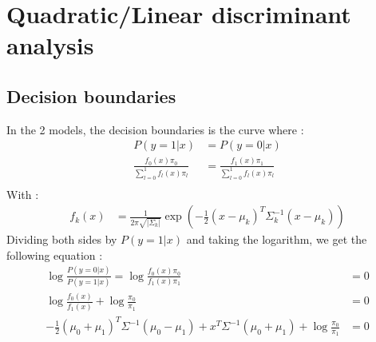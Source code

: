 \documentclass[12pt]{article}
\begin{document}
\section{Quadratic/Linear discriminant analysis}
\subsection{Decision boundaries}
In the 2 models, the decision boundaries is the curve where :
\begin{align}	
P(y=1|x) &= P(y=0|x)\\
\frac{f_0(x)\pi_0}{\sum^1_{l=0}f_l(x)\pi_l}&=\frac{f_1(x)\pi_1}{\sum^1_{l=0}f_l(x)\pi_l}\\
\end{align}
With : 
\begin{align}
	f_k(x) &= \frac{1}{2\pi\sqrt{|\Sigma_k|}}\exp\left(-\frac{1}{2}(x-\mu_k)^T\Sigma_k^{-1}(x-\mu_k)\right)
\end{align}
Dividing both sides by $P(y=1|x)$ and taking the logarithm, we get the following equation :
\begin{align}
	\log\frac{P(y=0|x)}{P(y=1|x)} = \log\frac{f_0(x)\pi_0}{f_1(x)\pi_1 }&=0\\
	\log\frac{f_0(x)}{f_1(x)} + \log\frac{\pi_0}{\pi_1}&= 0\\
	-\frac{1}{2}(\mu_0+\mu_1)^T\Sigma^{-1}(\mu_0-\mu_1) + x^T\Sigma^{-1}(\mu_0+\mu_1)+  \log\frac{\pi_0}{\pi_1} &= 0
\end{align}
\end{document}
